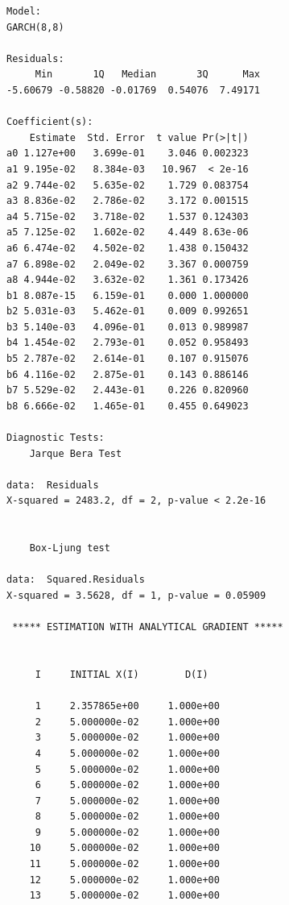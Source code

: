 \documentclass[11pt]{article}\usepackage[]{graphicx}\usepackage[]{color}
\makeatletter
\newenvironment{kframe}{%
 \def\at@end@of@kframe{}%
 \ifinner\ifhmode%
  \def\at@end@of@kframe{\end{minipage}}%
  \begin{minipage}{\columnwidth}%
 \fi\fi%
 \def\FrameCommand##1{\hskip\@totalleftmargin \hskip-\fboxsep
 \colorbox{shadecolor}{##1}\hskip-\fboxsep
     \hskip-\linewidth \hskip-\@totalleftmargin \hskip\columnwidth}%
 \MakeFramed {\advance\hsize-\width
   \@totalleftmargin\z@ \linewidth\hsize
   \@setminipage}}%
 {\par\unskip\endMakeFramed%
 \at@end@of@kframe}
\newenvironment{knitrout}{}{} %
\makeatother
\begin{document}
\begin{knitrout}
\begin{kframe}
\begin{verbatim}
Model:
GARCH(8,8)

Residuals:
     Min       1Q   Median       3Q      Max 
-5.60679 -0.58820 -0.01769  0.54076  7.49171 

Coefficient(s):
    Estimate  Std. Error  t value Pr(>|t|)
a0 1.127e+00   3.699e-01    3.046 0.002323
a1 9.195e-02   8.384e-03   10.967  < 2e-16
a2 9.744e-02   5.635e-02    1.729 0.083754
a3 8.836e-02   2.786e-02    3.172 0.001515
a4 5.715e-02   3.718e-02    1.537 0.124303
a5 7.125e-02   1.602e-02    4.449 8.63e-06
a6 6.474e-02   4.502e-02    1.438 0.150432
a7 6.898e-02   2.049e-02    3.367 0.000759
a8 4.944e-02   3.632e-02    1.361 0.173426
b1 8.087e-15   6.159e-01    0.000 1.000000
b2 5.031e-03   5.462e-01    0.009 0.992651
b3 5.140e-03   4.096e-01    0.013 0.989987
b4 1.454e-02   2.793e-01    0.052 0.958493
b5 2.787e-02   2.614e-01    0.107 0.915076
b6 4.116e-02   2.875e-01    0.143 0.886146
b7 5.529e-02   2.443e-01    0.226 0.820960
b8 6.666e-02   1.465e-01    0.455 0.649023

Diagnostic Tests:
	Jarque Bera Test

data:  Residuals
X-squared = 2483.2, df = 2, p-value < 2.2e-16


	Box-Ljung test

data:  Squared.Residuals
X-squared = 3.5628, df = 1, p-value = 0.05909

 ***** ESTIMATION WITH ANALYTICAL GRADIENT ***** 


     I     INITIAL X(I)        D(I)

     1     2.357865e+00     1.000e+00
     2     5.000000e-02     1.000e+00
     3     5.000000e-02     1.000e+00
     4     5.000000e-02     1.000e+00
     5     5.000000e-02     1.000e+00
     6     5.000000e-02     1.000e+00
     7     5.000000e-02     1.000e+00
     8     5.000000e-02     1.000e+00
     9     5.000000e-02     1.000e+00
    10     5.000000e-02     1.000e+00
    11     5.000000e-02     1.000e+00
    12     5.000000e-02     1.000e+00
    13     5.000000e-02     1.000e+00


\end{verbatim}
\end{kframe}
\end{knitrout}
\end{document}
